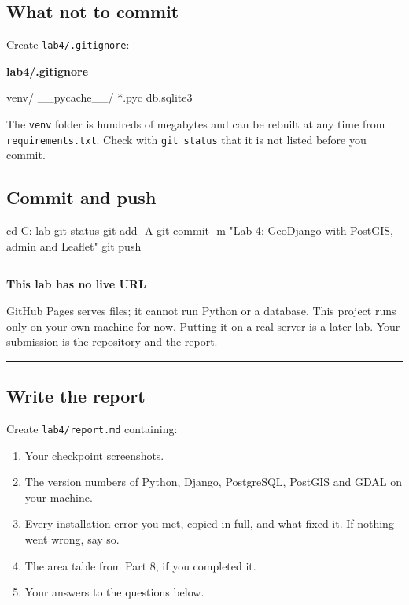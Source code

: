 \documentclass{article}
\newcommand{\cd}[1]{\texttt{#1}}
\newcommand{\codecap}[1]{%
  \par\vspace{.9em}\noindent\textbf{#1}\par\vspace{-.6em}}
\newenvironment{keypoint}[1]
  {\par\vspace{.7em}\noindent\rule{\linewidth}{.6pt}\par\vspace{.15em}
   \noindent\textbf{#1}\par\nobreak\vspace{-.3em}}
  {\par\vspace{.15em}\noindent\rule{\linewidth}{.6pt}\par\vspace{.7em}}
\begin{document}
\subsection{What not to commit}

Create \cd{lab4/.gitignore}:

\codecap{lab4/.gitignore}
\begin{code}
venv/
__pycache__/
*.pyc
db.sqlite3
\end{code}

The \cd{venv} folder is hundreds of megabytes and can be rebuilt at any
time from \cd{requirements.txt}. Check with \cd{git status} that it is
not listed before you commit.

\subsection{Commit and push}

\begin{code}
cd C:\webgis-lab
git status
git add -A
git commit -m "Lab 4: GeoDjango with PostGIS, admin and Leaflet"
git push
\end{code}

\begin{keypoint}{This lab has no live URL}
GitHub Pages serves files; it cannot run Python or a database. This
project runs only on your own machine for now. Putting it on a real
server is a later lab. Your submission is the repository and the report.
\end{keypoint}

\subsection{Write the report}

Create \cd{lab4/report.md} containing:

\begin{enumerate}
  \item Your checkpoint screenshots.
  \item The version numbers of Python, Django, PostgreSQL, PostGIS and
        GDAL on your machine.
  \item Every installation error you met, copied in full, and what fixed
        it. If nothing went wrong, say so.
  \item The area table from Part 8, if you completed it.
  \item Your answers to the questions below.
\end{enumerate}
\end{document}
